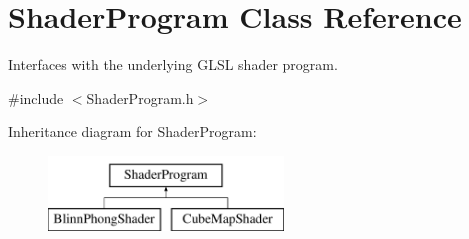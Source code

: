 \hypertarget{class_shader_program}{}\section{Shader\+Program Class Reference}
\label{class_shader_program}


Interfaces with the underlying G\+L\+SL shader program.




{\ttfamily \#include $<$Shader\+Program.\+h$>$}

Inheritance diagram for Shader\+Program\+:\begin{figure}[H]
\begin{center}
\leavevmode
\includegraphics[height=2.000000cm]{class_shader_program}
\end{center}
\end{figure}
